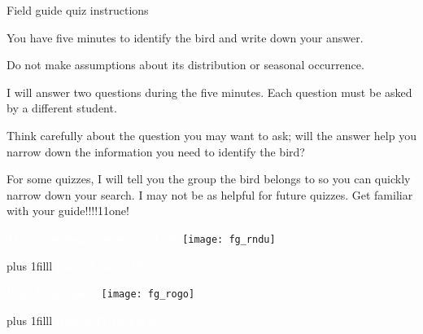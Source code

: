 \documentclass[t]{beamer}
\newcommand\imagecredit[1]{%
	\vskip0pt plus 1filll \tiny #1}%
\begin{document}
\begin{frame}{Field guide quiz instructions}

\vspace{-\baselineskip}

\hangpara You have five minutes to identify the bird and write down your answer.

\hangpara Do not make assumptions about its distribution or seasonal occurrence. 

\hangpara I will answer two questions during the five minutes. Each question 
must be asked by a different student. %

\hangpara Think carefully about the question you may want to ask; will the answer help you narrow down the information you need to identify the bird?

\hangpara For some quizzes, I will tell you the group the bird belongs to so you can quickly narrow down your search. I may not be as helpful for future quizzes. Get familiar with your guide!!!!11one!


\end{frame}


{
\begin{frame}[t,plain]{\textcolor{white}{This group begins on pages 12–13.}}
	\centering
		\texttt{[image: fg\_rndu]}

	\imagecredit{\hfill\textcolor{white}{Linda Tanner, Flickr, \ccby{2.0}.}}
\end{frame}
}


{
\begin{frame}[t,plain]{\textcolor{white}{Page 2 this time$\dots$}}
	\centering
		\texttt{[image: fg\_rogo]}

	\imagecredit{\hfill\textcolor{white}{Kaaren Perry, Flickr, \ccby{2.0}}}
\end{frame}
}
\end{document}
